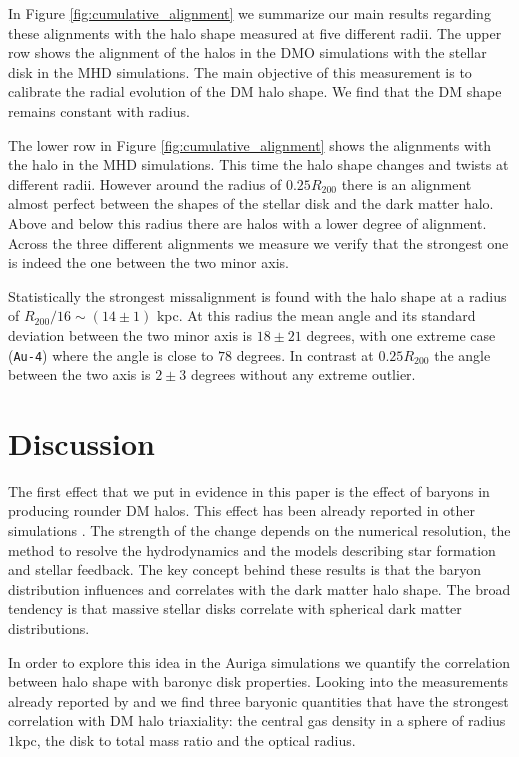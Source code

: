 \documentclass[a4paper,fleqn,usenatbib]{mnras}
\begin{document}
In Figure \ref{fig:cumulative_alignment} we summarize our main results
regarding these alignments with the halo shape measured at five
different radii.
The upper row shows the alignment of the halos in the DMO simulations
with the stellar disk in the MHD simulations.
The main objective of this measurement is to calibrate the radial
evolution of the DM halo shape. 
We find that the DM shape remains constant with radius.

The lower row in Figure \ref{fig:cumulative_alignment} shows the
alignments with the halo in the MHD simulations. 
This time the halo shape changes and twists at different radii.
However around the radius of $0.25R_{200}$ there is an alignment
almost perfect between the shapes of the stellar disk and the dark
matter halo. 
Above and below this radius there are halos with a lower degree of
alignment.
Across the three different alignments we measure we verify that the
strongest one is indeed the one between the two minor axis.

Statistically the strongest missalignment is found with the halo shape
at a radius of $R_{200}/16\sim (14\pm1)$ kpc. 
At this radius the mean angle and its standard deviation between the
two minor axis is $18 \pm 21$ degrees, with one extreme case
(\texttt{Au-4}) where the angle is close to $78$ degrees. 
In contrast at $0.25 R_{200}$ the angle between the two axis is
$2\pm 3$ degrees without any extreme outlier.





\section{Discussion}

The first effect that we put in evidence in this paper is the effect
of baryons in producing rounder DM halos.
This effect has been already reported in other simulations \citep{Debattista08, Bryan13,
  Butsky16, Chua19, Artale19}.
The strength of the change depends on the numerical resolution, the
method to resolve the hydrodynamics and the models describing star
formation and stellar feedback.
The key concept behind these results is that the baryon distribution
influences and correlates with the dark matter halo shape. 
The broad tendency is that massive stellar disks correlate with
spherical dark matter distributions.

In order to explore this idea in the Auriga simulations we quantify
the  correlation between halo shape with baronyc disk properties. 
Looking into the measurements already reported by \cite{auriga} and
\cite{Pakmor17} we find three baryonic quantities that have the
strongest correlation with DM halo triaxiality: the central gas
density in a sphere of radius $1$kpc, the disk to total mass ratio and
the optical radius.
\end{document}
